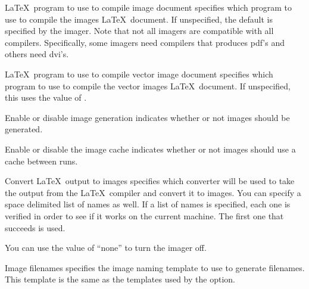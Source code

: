 \begin{configuration}{\LaTeX\ program to use to compile image document}
specifies which program to use to compile the images \LaTeX\ document. If
unspecified, the default is specified by the imager. Note that not all imagers
are compatible with all compilers. Specifically, some imagers need compilers
that produces pdf's and others need dvi's.
\end{configuration}

\begin{configuration}{\LaTeX\ program to use to compile vector image document}
specifies which program to use to compile the vector images \LaTeX\ document. If
unspecified, this uses the value of .
\end{configuration}

\begin{configuration}{Enable or disable image generation}
indicates whether or not images should be generated.
\end{configuration}

\begin{configuration}{Enable or disable the image cache}
indicates whether or not images should use a cache between runs.
\end{configuration}

\begin{configuration}{Convert \LaTeX\ output to images}
specifies which converter will be used to take the output from the
\LaTeX\ compiler and convert it to images.  You can specify a space
delimited list of names as well.  If a list of names is specified,
each one is verified in order to see if it works on the current machine.
The first one that succeeds is used.

You can use the value of ``none'' to turn the imager off.
\end{configuration}

\begin{configuration}{Image filenames}
specifies the image naming template to use to generate filenames.  This
template is the same as the templates used by the 
option.
\end{configuration}

